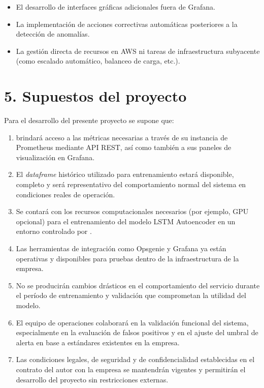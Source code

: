 \documentclass[
11pt, %
]{charter}
\begin{document}
\begin{itemize}
    \item El desarrollo de interfaces gráficas adicionales fuera de Grafana.
    \item La implementación de acciones correctivas automáticas posteriores a la detección de anomalías.
    \item La gestión directa de recursos en AWS ni tareas de infraestructura subyacente (como escalado automático, balanceo de carga, etc.).
\end{itemize}



\section{5. Supuestos del proyecto}
\label{sec:supuestos}

Para el desarrollo del presente proyecto se supone que:

\begin{enumerate}
    \item \clientename  \space brindará acceso a las métricas necesarias a través de su instancia de Prometheus mediante API REST, así como también a sus paneles de visualización en Grafana.
    \item El \textit{dataframe} histórico utilizado para entrenamiento estará disponible, completo y será representativo del comportamiento normal del sistema en condiciones reales de operación.
    \item Se contará con los recursos computacionales necesarios (por ejemplo, GPU opcional) para el entrenamiento del modelo LSTM Autoencoder en un entorno controlado por \clientename.
    \item Las herramientas de integración como Opsgenie y Grafana ya están operativas y disponibles para pruebas dentro de la infraestructura de la empresa.
    \item No se producirán cambios drásticos en el comportamiento del servicio durante el período de entrenamiento y validación que comprometan la utilidad del modelo.
    \item El equipo de operaciones colaborará en la validación funcional del sistema, especialmente en la evaluación de falsos positivos y en el ajuste del umbral de alerta en base a estándares existentes en la empresa.
    \item Las condiciones legales, de seguridad y de confidencialidad establecidas en el contrato del autor con la empresa se mantendrán vigentes y permitirán el desarrollo del proyecto sin restricciones externas.
\end{enumerate}
\end{document}
